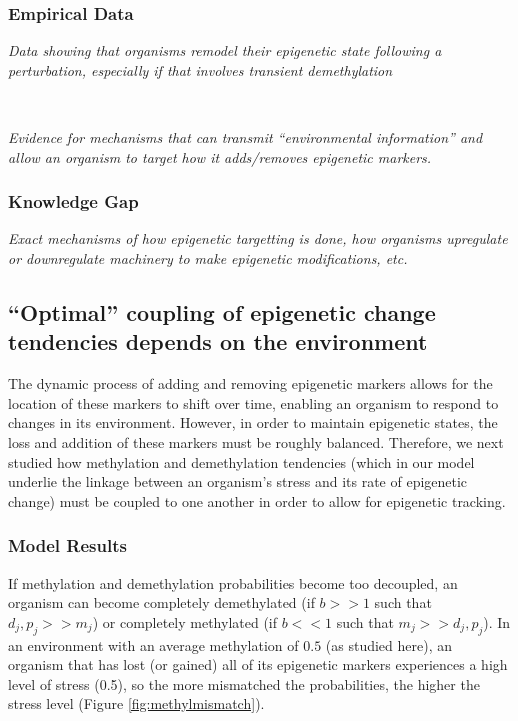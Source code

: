 \documentclass{article}
\begin{document}
\subsubsection{Empirical Data}

\textit{Data showing that organisms remodel their epigenetic state following a perturbation, especially if that involves transient demethylation}

\ 

\textit{Evidence for mechanisms that can transmit ``environmental information'' and allow an organism to target how it adds/removes epigenetic markers.}


\subsubsection{Knowledge Gap}

\textit{Exact mechanisms of how epigenetic targetting is done, how organisms upregulate or downregulate machinery to make epigenetic modifications, etc.}



\clearpage

\subsection{``Optimal'' coupling of epigenetic change tendencies depends on the environment}

The dynamic process of adding and removing epigenetic markers allows for the location of these markers to shift over time, enabling an organism to respond to changes in its environment. However, in order to maintain epigenetic states, the loss and addition of these markers must be roughly balanced. Therefore, we next studied how methylation and demethylation tendencies (which in our model underlie the linkage between an organism's stress and its rate of epigenetic change) must be coupled to one another in order to allow for epigenetic tracking.


\subsubsection{Model Results}

If methylation and demethylation probabilities become too decoupled, an organism can become completely demethylated (if $b >> 1$ such that $d_j, p_j >> m_j$) or completely methylated (if $b<<1$ such that $m_j >> d_j,p_j$). In an environment with an average methylation of $0.5$ (as studied here), an organism that has lost (or gained) all of its epigenetic markers experiences a high level of stress (0.5), so the more mismatched the probabilities, the higher the stress level (Figure \ref{fig:methylmismatch}).
\end{document}
